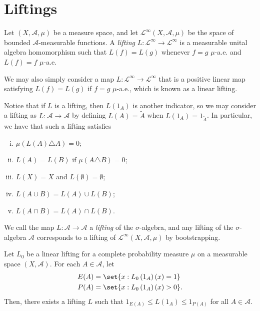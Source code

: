\documentclass[10pt]{mypackage}
\begin{document}
\section{Liftings}%
\begin{definition}
  Let $\left( X,\mathcal{A},\mu \right)$ be a measure space, and let $\mathcal{L}^{\infty}\left( X,\mathcal{A},\mu \right)$ be the space of bounded $\mathcal{A}$-measurable functions. A \textit{lifting} $L\colon \mathcal{L}^{\infty}\to \mathcal{L}^{\infty}$ is a measurable unital algebra homomorphism such that $L(f) = L(g)$ whenever $f = g$ $\mu$-a.e. and $L(f)= f$ $\mu$-a.e.

  We may also simply consider a map $L\colon \mathcal{L}^{\infty}\to \mathcal{L}^{\infty}$ that is a positive linear map satisfying $L(f) = L(g)$ if $f = g$ $\mu$-a.e., which is known as a linear lifting.
\end{definition}
Notice that if $L$ is a lifting, then $L\left( 1_A \right)$ is another indicator, so we may consider a lifting as $L\colon \mathcal{A}\to \mathcal{A}$ by defining $L(A) = \widetilde{A}$ when $L\left( 1_A \right) = 1_{\widetilde{A}}$. In particular, we have that such a lifting satisfies
\begin{enumerate}[(i)]
  \item $\mu\left( L(A)\triangle A \right) = 0$;
  \item $L(A) = L(B)$ if $\mu\left( A\triangle B \right) = 0$;
  \item $L(X) = X$ and $L(\emptyset) = \emptyset$;
  \item $L\left( A\cup B \right) = L(A)\cup L(B)$;
  \item $L\left( A\cap B \right) = L(A)\cap L(B)$.
\end{enumerate}
We call the map $L\colon \mathcal{A}\to \mathcal{A}$ a \textit{lifting} of the $\sigma$-algebra, and any lifting of the $\sigma$-algebra $\mathcal{A}$ corresponds to a lifting of $\mathcal{L}^{\infty}\left( X,\mathcal{A},\mu \right)$ by bootstrapping.
\begin{lemma}
  Let $L_0$ be a linear lifting for a complete probability measure $\mu$ on a measurable space $\left( X,\mathcal{A} \right)$. For each $A\in \mathcal{A}$, let
  \begin{align*}
    E(A) &= \set{x : L_0\left( 1_A \right)(x) = 1}\\
    P(A) &= \set{x : L_0\left(1_A\right)(x) > 0}.
  \end{align*}
  Then, there exists a lifting $L$ such that $1_{E(A)}\leq L\left(1_A\right) \leq 1_{P(A)}$ for all $A\in \mathcal{A}$.
\end{lemma}
\end{document}
